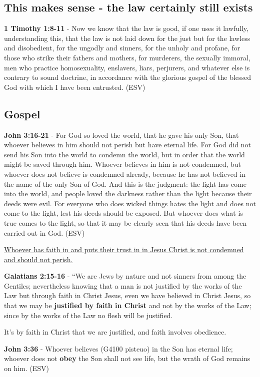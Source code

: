 \documentclass[11pt]{article}
\begin{document}
\subsection{This makes sense - the law certainly still exists}
\label{sec:org1b76afe}
\textbf{1 Timothy 1:8-11} -  Now we know that the law is good, if one uses it lawfully, understanding this, that the law is not laid down for the just but for the lawless and disobedient, for the ungodly and sinners, for the unholy and profane, for those who strike their fathers and mothers, for murderers, the sexually immoral, men who practice homosexuality, enslavers, liars, perjurers, and whatever else is contrary to sound doctrine, in accordance with the glorious gospel of the blessed God with which I have been entrusted.  (ESV)

\subsection{Gospel}
\label{sec:orgfa99e97}
\textbf{John 3:16-21} - For God so loved the world, that he gave his only Son, that whoever believes in him should not perish but have eternal life. For God did not send his Son into the world to condemn the world, but in order that the world might be saved through him. Whoever believes in him is not condemned, but whoever does not believe is condemned already, because he has not believed in the name of the only Son of God. And this is the judgment: the light has come into the world, and people loved the darkness rather than the light because their deeds were evil. For everyone who does wicked things hates the light and does not come to the light, lest his deeds should be exposed. But whoever does what is true comes to the light, so that it may be clearly seen that his deeds have been carried out in God. (ESV)

\uline{Whoever has faith in and puts their trust in in Jesus Christ is not condemned and should not perish.}

\textbf{Galatians 2:15-16} - “We are Jews by nature and not sinners from among the Gentiles; nevertheless knowing that a man is not justified by the works of the Law but through faith in Christ Jesus, even we have believed in Christ Jesus, so that we may be \textbf{justified by faith in Christ} and not by the works of the Law; since by the works of the Law no flesh will be justified.

It's by faith in Christ that we are justified, and faith involves obedience.

\textbf{John 3:36} - Whoever believes (G4100 pisteuo) in the Son has eternal life; whoever does not \textbf{obey} the Son shall not see life, but the wrath of God remains on him. (ESV)
\end{document}
